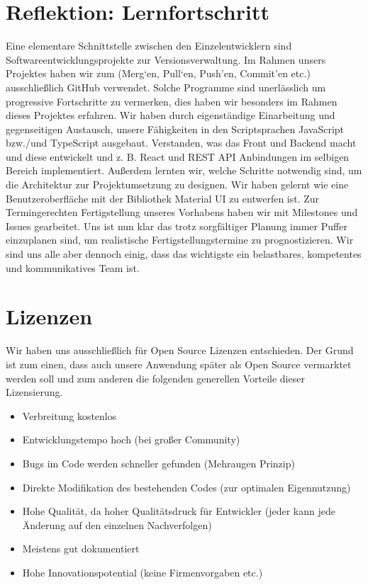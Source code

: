 \section{Reflektion: Lernfortschritt}
Eine elementare Schnittstelle zwischen den Einzelentwicklern sind Softwareentwicklungsprojekte zur Versionsverwaltung. 
Im Rahmen unsers Projektes haben wir zum (Merg‘en, Pull‘en, Push’en, Commit’en etc.) ausschließlich GitHub verwendet. 
Solche Programme sind unerlässlich um progressive Fortschritte zu vermerken, dies haben wir besonders im Rahmen dieses Projektes erfahren. 
Wir haben durch eigenständige Einarbeitung und gegenseitigen Austausch, unsere Fähigkeiten in den Scriptsprachen JavaScript bzw./und TypeScript ausgebaut. 
Verstanden, was das  Front und Backend macht und diese entwickelt und z. B. React und REST API Anbindungen im selbigen Bereich implementiert. 
Außerdem lernten wir, welche Schritte notwendig sind, um die Architektur zur Projektumsetzung zu designen. 
Wir haben gelernt wie eine Benutzeroberfläche mit der Bibliothek Material UI zu entwerfen ist. 
Zur Termingerechten Fertigstellung unseres Vorhabens haben wir mit Milestones und Issues gearbeitet. 
Uns ist nun klar das trotz sorgfältiger Planung immer Puffer einzuplanen sind, um realistische Fertigstellungstermine zu prognostizieren. 
Wir sind uns alle aber dennoch einig, dass das wichtigste ein belastbares, kompetentes und kommunikatives Team ist.  

\section{Lizenzen}
Wir haben uns ausschließlich für Open Source Lizenzen entschieden. 
Der Grund ist zum einen, dass auch unsere Anwendung später als Open Source vermarktet werden soll und zum anderen die folgenden generellen Vorteile dieser Lizensierung.

\begin{itemize}
    \item	Verbreitung kostenlos
    \item   Entwicklungstempo hoch (bei großer Community)
    \item   Bugs im Code werden schneller gefunden (Mehraugen Prinzip)
    \item	Direkte Modifikation des bestehenden Codes (zur optimalen Eigennutzung)
    \item	Hohe Qualität, da hoher Qualitätsdruck für Entwickler (jeder kann jede Änderung auf den einzelnen Nachverfolgen)
    \item	Meistens gut dokumentiert
    \item	Hohe Innovationspotential (keine Firmenvorgaben etc.)
\end{itemize}

